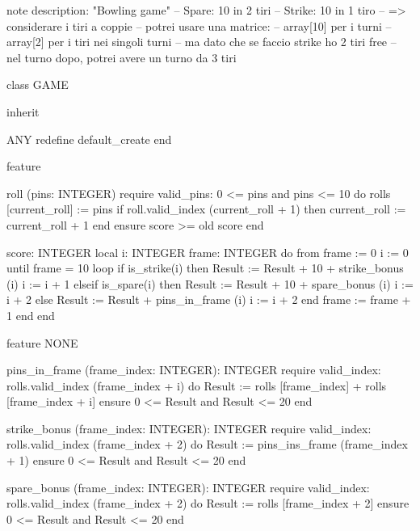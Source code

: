note
	description: "Bowling game"
-- Spare: 10 in 2 tiri
-- Strike: 10 in 1 tiro
-- => considerare i tiri a coppie
-- potrei usare una matrice:
-- array[10] per i turni
-- array[2] per i tiri nei singoli turni
-- ma dato che se faccio strike ho 2 tiri free
-- nel turno dopo, potrei avere un turno da 3 tiri


class
    GAME

inherit

    ANY
        redefine
            default_create
        end

feature

    roll (pins: INTEGER)
        require
            valid_pins: 0 <= pins and pins <= 10
        do
            rolls [current_roll] := pins
            if roll.valid_index (current_roll + 1) then
                current_roll := current_roll + 1
            end
        ensure
            score >= old score
        end
    
    score: INTEGER
        local
            i: INTEGER
            frame: INTEGER
        do
            from
                frame := 0
                i := 0
            until
                frame = 10
            loop
                if is_strike(i) then
                    Result := Result + 10 + strike_bonus (i)
                    i := i + 1
                elseif is_spare(i) then
                    Result := Result + 10 + spare_bonus (i)
                    i := i + 2
                else
                    Result := Result + pins_in_frame (i)
                    i := i + 2
                end
                frame := frame + 1
            end
        end
        
feature {NONE}

    pins_in_frame (frame_index: INTEGER): INTEGER
        require
            valid_index: rolls.valid_index (frame_index + i)
        do
            Result := rolls [frame_index] + rolls [frame_index + i]
        ensure
            0 <= Result and Result <= 20
        end
        
    strike_bonus (frame_index: INTEGER): INTEGER
        require
            valid_index: rolls.valid_index (frame_index + 2)
        do
            Result := pins_ins_frame (frame_index + 1)
        ensure
            0 <= Result and Result <= 20
        end
        
    spare_bonus (frame_index: INTEGER): INTEGER
        require
            valid_index: rolls.valid_index (frame_index + 2)
        do
            Result := rolls [frame_index + 2]
        ensure
            0 <= Result and Result <= 20
        end
        
